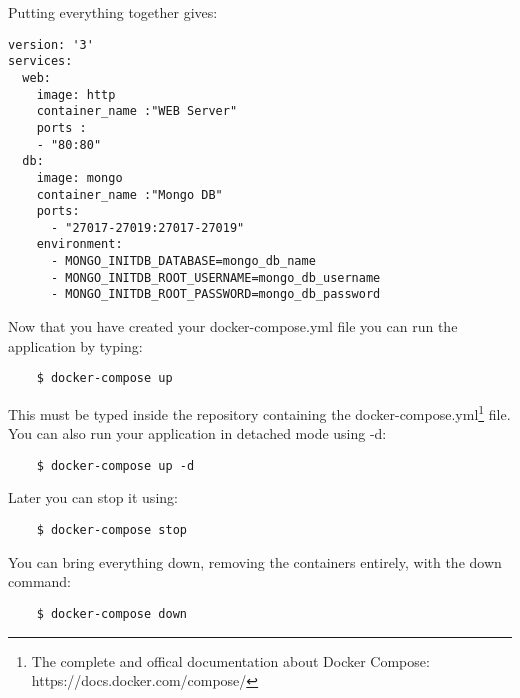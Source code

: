 \documentclass[handout]{beamer}[10pt, usepdftitle=false]
\begin{document}
	\begin{frame}[fragile]
	Putting everything together gives:
	\vspace*{0.6em}
	
	\begin{verbatim}
version: '3'
services:
  web:
    image: http
    container_name :"WEB Server"
    ports :
    - "80:80"
  db:
    image: mongo
    container_name :"Mongo DB"
    ports:
      - "27017-27019:27017-27019"
    environment:
   	  - MONGO_INITDB_DATABASE=mongo_db_name
      - MONGO_INITDB_ROOT_USERNAME=mongo_db_username
      - MONGO_INITDB_ROOT_PASSWORD=mongo_db_password
	\end{verbatim}
	
	\end{frame}
	\begin{frame}[fragile]
	Now that you have created your docker-compose.yml file you can run the application by typing:
	\vspace*{0.6em}

	\begin{verbatim}
	$ docker-compose up 
	\end{verbatim} 

	This must be typed inside the repository containing the docker-compose.yml\footnote{The complete and offical documentation about Docker Compose: https://docs.docker.com/compose/} file.
	You can also run your application in detached mode using -d:
	\vspace*{0.6em}

	\begin{verbatim}
	$ docker-compose up -d
	\end{verbatim}
	
	Later you can stop it using:
	\vspace*{0.6em}
	
	\begin{verbatim}
	$ docker-compose stop
	\end{verbatim}
	
	You can bring everything down, removing the containers entirely, with the down command:
	\vspace*{0.6em}
	
	\begin{verbatim}
	$ docker-compose down
	\end{verbatim}

	

	\end{frame}
\end{document}
